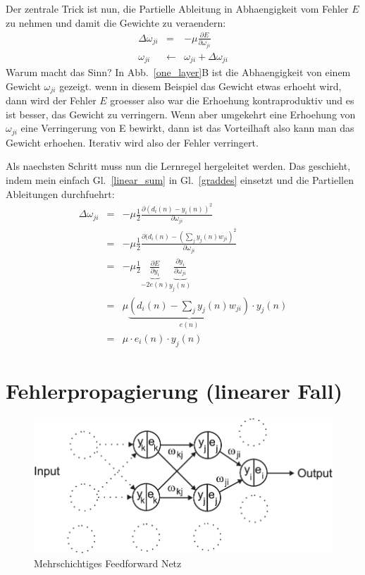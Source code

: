\documentclass[12pt]{article}
\begin{document}
Der zentrale Trick ist nun, die Partielle Ableitung in Abhaengigkeit vom Fehler $E$ zu nehmen
und damit die Gewichte zu veraendern:
\begin{eqnarray}
  \Delta\omega_{ji} & = & - \mu \frac{\partial E}{\partial \omega_{ji}} \label{graddes} \\
  \omega_{ji} & \leftarrow & \omega_{ji} + \Delta\omega_{ji}
\end{eqnarray}
Warum macht das Sinn? In Abb.~\ref{one_layer}B ist die Abhaengigkeit von einem Gewicht
$\omega_{ji}$ gezeigt. wenn in diesem Beispiel das Gewicht etwas erhoeht wird, dann
wird der Fehler $E$ groesser also war die Erhoehung kontraproduktiv und es ist besser,
das Gewicht zu verringern. Wenn aber umgekehrt eine Erhoehung von $\omega_{ji}$ eine
Verringerung von E bewirkt, dann ist das Vorteilhaft also kann man das Gewicht erhoehen.
Iterativ wird also der Fehler verringert.

Als naechsten Schritt muss nun die Lernregel hergeleitet werden. Das geschieht, indem
mein einfach Gl.~\ref{linear_sum} in Gl.~\ref{graddes} einsetzt und die Partiellen Ableitungen
durchfuehrt:
\begin{eqnarray}
  \Delta\omega_{ji}
   & = & - \mu \frac{1}{2} \frac{\partial ( d_i(n) - y_i(n) )^2 }{\partial \omega_{ji}} \\
   & = & - \mu \frac{1}{2} \frac{\partial ( d_i(n) - \left( \sum_j y_j(n) w_{ji} \right)^2 }{\partial \omega_{ji}} \\
   & = & - \mu \frac{1}{2} \underbrace{\frac{\partial E}{\partial y_i}}_{-2e(n)} \underbrace{\frac{\partial y_i}{\partial \omega_{ji}}}_{y_j(n)} \\
  & = & \mu \underbrace{\left(d_i(n) - \sum_j y_j(n) w_{ji}\right)}_{e(n)} \cdot y_j(n) \\
  & = & \mu \cdot e_i(n) \cdot y_j(n)
\end{eqnarray}

\section{Fehlerpropagierung (linearer Fall)}
\begin{figure}[!hbt]
\begin{center}
\mbox{\includegraphics[width=\textwidth]{multi_layer}}
\end{center}
\caption{Mehrschichtiges Feedforward Netz
\label{multi_layer}}
\end{figure}
\end{document}
